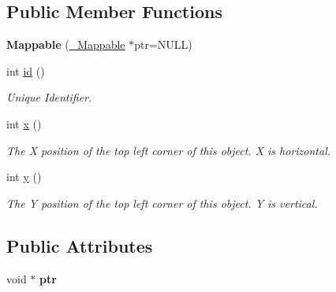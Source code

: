 \subsection*{Public Member Functions}
\begin{DoxyCompactItemize}
\item 
\hypertarget{classMappable_abb17854ba5e1c7d295c7277498227b80}{
{\bfseries Mappable} (\hyperlink{struct__Mappable}{\_\-Mappable} $\ast$ptr=NULL)}
\label{classMappable_abb17854ba5e1c7d295c7277498227b80}

\item 
\hypertarget{classMappable_a32bdecfde44acd6ac6eaecad2a2f7c25}{
int \hyperlink{classMappable_a32bdecfde44acd6ac6eaecad2a2f7c25}{id} ()}
\label{classMappable_a32bdecfde44acd6ac6eaecad2a2f7c25}

\begin{DoxyCompactList}\small\item\em Unique Identifier. \item\end{DoxyCompactList}\item 
\hypertarget{classMappable_a5295c64e0fb8536fac76f6722f28d051}{
int \hyperlink{classMappable_a5295c64e0fb8536fac76f6722f28d051}{x} ()}
\label{classMappable_a5295c64e0fb8536fac76f6722f28d051}

\begin{DoxyCompactList}\small\item\em The X position of the top left corner of this object. X is horizontal. \item\end{DoxyCompactList}\item 
\hypertarget{classMappable_a9beaf7680b58a574d8ee102a85c2cb9e}{
int \hyperlink{classMappable_a9beaf7680b58a574d8ee102a85c2cb9e}{y} ()}
\label{classMappable_a9beaf7680b58a574d8ee102a85c2cb9e}

\begin{DoxyCompactList}\small\item\em The Y position of the top left corner of this object. Y is vertical. \item\end{DoxyCompactList}\end{DoxyCompactItemize}
\subsection*{Public Attributes}
\begin{DoxyCompactItemize}
\item 
\hypertarget{classMappable_a8d9f478e553703116d7f636f19461de4}{
void $\ast$ {\bfseries ptr}}
\label{classMappable_a8d9f478e553703116d7f636f19461de4}

\end{DoxyCompactItemize}
